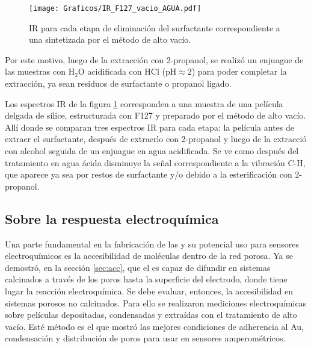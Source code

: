 			\begin{figure}[hb!]
			\begin{center}
			\texttt{[image: Graficos/IR\_F127\_vacio\_AGUA.pdf]}
			\caption[FTIR extracción agua ácida.]{IR para cada etapa de eliminación del surfactante correspondiente a una \pdmF\space sintetizada por el método de alto vacío.}
			\label{fig:IR_agua}
			\end{center}
			\end{figure}

			
		Por este motivo, luego de la extracción con 2-propanol, se realizó un enjuague de las muestras con H$_2$O acidificada con HCl (pH$\approx 2$) para poder completar la extracción, ya sean residuos de surfactante o propanol ligado.
				
		Los espectros IR de la figura \ref{fig:IR_agua} corresponden a una muestra de una película delgada de sílice, estructurada con F127 y preparado por el método de alto vacío. Allí donde se comparan tres espectros IR para cada etapa: la película antes de extraer el surfactante, después de extraerlo con 2-propanol y luego de la extracció con alcohol seguida de un enjuague en agua acidificada. Se ve como después del tratamiento en agua ácida disminuye la señal correspondiente a la vibración C-H, que aparece ya sea por restos de surfactante y/o debido a la esterificación con 2-propanol.

	\subsection{Sobre la respuesta electroquímica}\label{sec:acc_eq}

	  Una parte fundamental en la fabricación de las \pdm\space y su potencial uso para sensores electroquímicos es la accesibilidad de moléculas dentro de la red porosa. Ya se demostró, en la sección \ref{sec:acc}, que el \aminorutenio\space es capaz de difundir en sistemas calcinados a través de los poros hasta la superficie del electrodo, donde tiene lugar la reacción electroquímica. Se debe evaluar, entonces, la accesibilidad en sistemas porosos no calcinados. Para ello se realizaron mediciones electroquímicas sobre películas depositadas, condensadas y extraídas con el tratamiento de alto vacío. Esté método es el que mostró las mejores condiciones de adherencia al Au, condensación y distribución de poros para usar en sensores amperométricos. 

